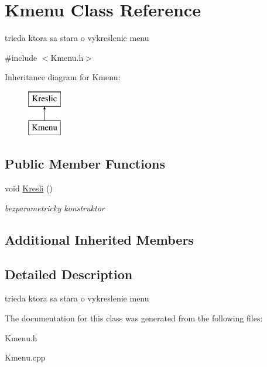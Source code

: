 \hypertarget{class_kmenu}{\section{Kmenu Class Reference}
\label{class_kmenu}
}


trieda ktora sa stara o vykreslenie menu  




{\ttfamily \#include $<$Kmenu.\-h$>$}

Inheritance diagram for Kmenu\-:\begin{figure}[H]
\begin{center}
\leavevmode
\includegraphics[height=2.000000cm]{class_kmenu}
\end{center}
\end{figure}
\subsection*{Public Member Functions}
\begin{DoxyCompactItemize}
\item 
\hypertarget{class_kmenu_ad8d318b904d5b90a0a01645527b0e8ba}{void \hyperlink{class_kmenu_ad8d318b904d5b90a0a01645527b0e8ba}{Kresli} ()}\label{class_kmenu_ad8d318b904d5b90a0a01645527b0e8ba}

\begin{DoxyCompactList}\small\item\em bezparametricky konstruktor \end{DoxyCompactList}\end{DoxyCompactItemize}
\subsection*{Additional Inherited Members}


\subsection{Detailed Description}
trieda ktora sa stara o vykreslenie menu 

The documentation for this class was generated from the following files\-:\begin{DoxyCompactItemize}
\item 
Kmenu.\-h\item 
Kmenu.\-cpp\end{DoxyCompactItemize}
